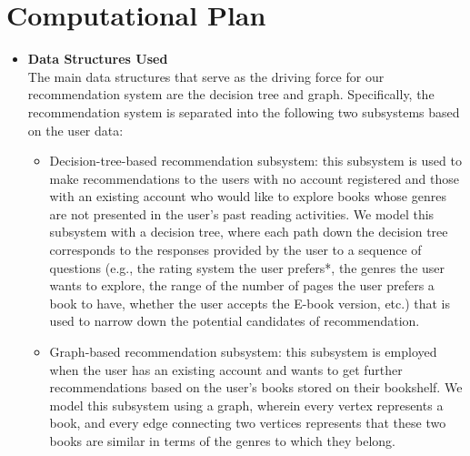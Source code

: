 \documentclass[fontsize=11pt]{article}
\begin{document}
\section*{Computational Plan}

\begin{itemize}

\item \textbf{Data Structures Used} \\
The main data structures that serve as the driving force for our recommendation system are the decision tree and graph. Specifically, the recommendation system is separated into the following two subsystems based on the user data:
\begin{itemize} 
\item Decision-tree-based recommendation subsystem: this subsystem is used to make recommendations to the users with no account registered and those with an existing account who would like to explore books whose genres are not presented in the user’s past reading activities. We model this subsystem with a decision tree, where each path down the decision tree corresponds to the responses provided by the user to a sequence of questions (e.g., the rating system the user prefers*, the genres the user wants to explore, the range of the number of pages the user prefers a book to have, whether the user accepts the E-book version, etc.) that is used to narrow down the potential candidates of recommendation.
 
\item Graph-based recommendation subsystem: this subsystem is employed when the user has an existing account and wants to get further recommendations based on the user’s books stored on their bookshelf. We model this subsystem using a graph, wherein every vertex represents a book, and every edge connecting two vertices represents that these two books are similar in terms of the genres to which they belong.
\end{itemize}


\end{itemize}
\end{document}
